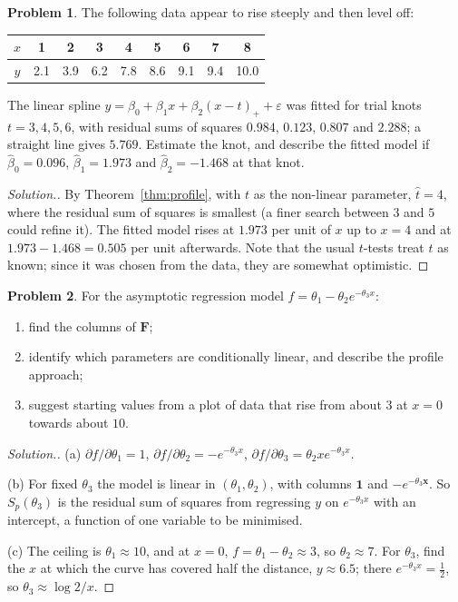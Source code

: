 \documentclass[11pt,a4paper]{article}
\numberwithin{equation}{section}
\theoremstyle{definition}
\newtheorem{problemx}{Problem}[subsection]
\newenvironment{problem}{\begin{problemx}}{\end{problemx}}
\newenvironment{solution}
  {\renewcommand{\qedsymbol}{}\begin{proof}[\textit{Solution}.]}
  {\end{proof}}
\begin{document}
\begin{problem}\label{prob:knot}
The following data appear to rise steeply and then level off:
\begin{center}
\begin{tabular}{c|cccccccc}
$x$ & 1 & 2 & 3 & 4 & 5 & 6 & 7 & 8 \\
\hline
$y$ & 2.1 & 3.9 & 6.2 & 7.8 & 8.6 & 9.1 & 9.4 & 10.0 \\
\end{tabular}
\end{center}
The linear spline $y = \beta_0 + \beta_1x + \beta_2(x - t)_+ + \varepsilon$ was fitted for trial knots $t = 3, 4, 5, 6$, with residual sums of squares
$0.984$, $0.123$, $0.807$ and $2.288$; a straight line gives $5.769$. Estimate the knot, and describe the fitted
model if $\hat\beta_0 = 0.096$, $\hat\beta_1 = 1.973$ and $\hat\beta_2 = -1.468$ at that knot.
\end{problem}

\begin{solution}
By Theorem~\ref{thm:profile}, with $t$ as the non-linear parameter, $\hat t = 4$, where the residual sum of squares is smallest
(a finer search between $3$ and $5$ could refine it). The fitted model rises at $1.973$ per unit of $x$ up to $x = 4$ and at
$1.973 - 1.468 = 0.505$ per unit afterwards. Note that the usual $t$-tests treat $t$ as known; since it was chosen from the
data, they are somewhat optimistic.
\end{solution}

\begin{problem}\label{prob:asymptotic}
For the asymptotic regression model $f = \theta_1 - \theta_2e^{-\theta_3x}$:
\begin{enumerate}[label=(\alph*)]
\item find the columns of $\mathbf{F}$;
\item identify which parameters are conditionally linear, and describe the profile approach;
\item suggest starting values from a plot of data that rise from about $3$ at $x = 0$ towards about $10$.
\end{enumerate}
\end{problem}

\begin{solution}
(a) $\partial f/\partial\theta_1 = 1$, $\partial f/\partial\theta_2 = -e^{-\theta_3x}$, $\partial f/\partial\theta_3 = \theta_2xe^{-\theta_3x}$.

(b) For fixed $\theta_3$ the model is linear in $(\theta_1, \theta_2)$, with columns $\mathbf{1}$ and $-e^{-\theta_3\mathbf{x}}$. So $S_p(\theta_3)$ is the residual sum
of squares from regressing $y$ on $e^{-\theta_3x}$ with an intercept, a function of one variable to be minimised.

(c) The ceiling is $\theta_1 \approx 10$, and at $x = 0$, $f = \theta_1 - \theta_2 \approx 3$, so $\theta_2 \approx 7$. For $\theta_3$, find the $x$ at which the curve has
covered half the distance, $y \approx 6.5$; there $e^{-\theta_3x} = \frac12$, so $\theta_3 \approx \log 2/x$.
\end{solution}
\end{document}
